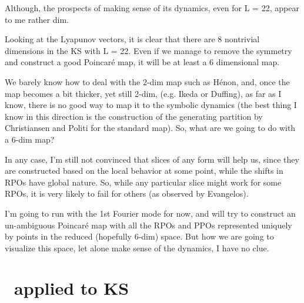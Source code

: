 \begin{description}
Although, the prospects of making sense of its dynamics, even
for L = 22, appear to me rather dim.

Looking at the Lyapunov vectors, it is clear that there are 8
nontrivial dimensions in the KS with L = 22.  Even if we
manage to remove the symmetry and construct a good Poincar\'e
map, it will be at least a 6 dimensional map.

We barely know how to deal with the 2-dim map such as H\'enon,
and, once the map becomes a bit thicker, yet still 2-dim,
(e.g. Ikeda or Duffing), as far as I know, there is no good
way to map it to the symbolic dynamics (the best thing I know
in this direction is the construction of the generating
partition by Christiansen and Politi for the standard map).
So, what are we going to do with a 6-dim map?

In any case, I'm still not convinced that slices of any form
will help us, since they are constructed based on the local
behavior at some point, while the shifts in RPOs have global
nature.  So, while any particular slice might work for some
RPOs, it is very likely to fail for others (as observed by
Evangelos).

I'm going to run with the 1st Fourier mode for now, and will
try to construct an un-ambiguous Poincar\'e map with all the
RPOs and PPOs represented uniquely by points in the reduced
(hopefully 6-dim) space. But how we are going to visualize
this space, let alone make sense of the dynamics, I have no
clue.

\end{description}

\section{\Mslices\ applied to KS}
\renewcommand{\LieElrep}{\ensuremath{g}} %

